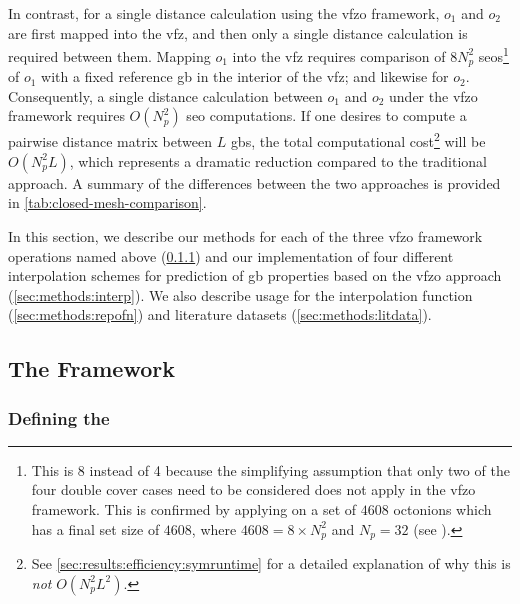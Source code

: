 \documentclass[final,twocolumn,12pt]{elsarticle}
\begin{document}
In contrast, for a single distance calculation using the \gls{vfzo} framework, $o_1$ and $o_2$ are first mapped into the \gls{vfz}, and then only a single distance calculation is required between them. Mapping $o_1$ into the \gls{vfz} requires comparison of $8N_p^2$ \glspl{seo}\footnote{This is 8 instead of 4 because the simplifying assumption that only two of the four double cover cases need to be considered \cite{francisGeodesicOctonionMetric2019} does not apply in the \gls{vfzo} framework. This is confirmed by applying  on a set of $4608$ octonions which has a final set size of $4608$, where $4608=8\times N_p^2$ and $N_p=32$ (see ).} of $o_1$ with a fixed reference \gls{gb} in the interior of the \gls{vfz}; and likewise for $o_2$. Consequently, a single distance calculation between $o_1$ and $o_2$ under the \gls{vfzo} framework requires $O(N_p^2)$ \gls{seo} computations. If one desires to compute a pairwise distance matrix between $L$ \glspl{gb}, the total computational cost\footnote{See \cref{sec:results:efficiency:symruntime} for a detailed explanation of why this is \emph{not} $O(N_p^2L^2)$.} will be $O(N_p^2L)$, which represents a dramatic reduction compared to the traditional approach. A summary of the differences between the two approaches is provided in \cref{tab:closed-mesh-comparison}.

In this section, we describe our methods for each of the three \gls{vfzo} framework operations named above (\cref{sec:methods:framework:vfz}) and our implementation of four different interpolation schemes for prediction of \gls{gb} properties based on the \gls{vfzo} approach (\cref{sec:methods:interp}). We also describe usage for the interpolation function (\cref{sec:methods:repofn}) and literature datasets (\cref{sec:methods:litdata}).

\subsection{The  Framework}
\label{sec:methods:framework}

\subsubsection{Defining the }
\label{sec:methods:framework:vfz}

\end{document}
